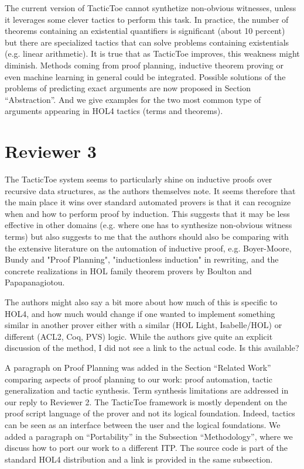 \documentclass[]{scrartcl}
\begin{document}
The current version of TacticToe cannot synthetize non-obvious 
witnesses, unless it leverages some clever 
tactics to perform this task. In practice, the number of theorems containing 
an existential quantifiers is significant (about 10 percent) but there are 
specialized tactics that can solve problems containing existentials (e.g. 
linear arithmetic). It is true that as TacticToe improves, this weakness 
might diminish. Methods coming from proof planning, inductive 
theorem proving or even machine learning in general could be integrated.
Possible solutions of the problems of predicting exact arguments are now 
proposed in Section ``Abstraction''. And we give examples for the two most 
common type of arguments appearing in HOL4 tactics (terms and theorems).

\section*{Reviewer 3}

\begin{leftbar}
The TacticToe system seems to particularly shine on inductive proofs over
recursive data structures, as the authors themselves note. It seems
therefore that the main place it wins over standard automated provers is
that it can recognize when and how to perform proof by induction. This
suggests that it may be less effective in other domains (e.g. where one has
to synthesize non-obvious witness terms) but also suggests to me that the
authors should also be comparing with the extensive literature on the
automation of inductive proof, e.g. Boyer-Moore, Bundy and "Proof
Planning", "inductionless induction" in rewriting, and the concrete
realizations in HOL family theorem provers by Boulton and Papapanagiotou.

The authors might also say a bit more about how much of this is specific to
HOL4, and how much would change if one wanted to implement something
similar in another prover either with a similar (HOL Light, Isabelle/HOL)
or different (ACL2, Coq, PVS) logic. While the authors give quite an
explicit discussion of the method, I did not see a link to the actual code.
Is this available?
\end{leftbar}

A paragraph on Proof Planning was added in the Section ``Related Work'' 
comparing aspects of proof planning to our work: proof automation, tactic 
generalization and tactic synthesis. Term synthesis limitations are
addressed in our reply to Reviewer 2.
The TacticToe framework is mostly dependent on the proof script language of the 
prover and not its logical foundation. Indeed, tactics can be seen as an 
interface between the user and the logical foundations. We added a 
paragraph on ``Portability'' in the Subsection ``Methodology'', where we 
discuss how to port our work to a different ITP. The source code is part of the 
standard HOL4 distribution and a link is provided in the same subsection.
\end{document}
